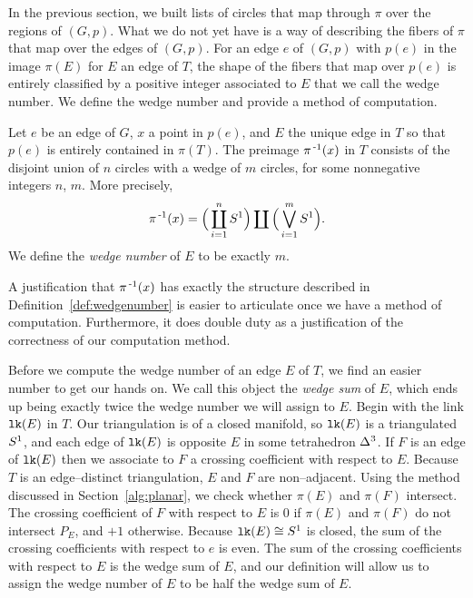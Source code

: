 \label{alg:countwedge}

In the previous section, we built lists of circles that map through $\pi$ over the regions of $(G,p)$.
What we do not yet have is a way of describing the fibers of $\pi$ that map over the edges of $(G,p)$.
For an edge $e$ of $(G,p)$ with $p(e)$ in the image $\pi(E)$ for $E$ an edge of $T$, the shape of the fibers that map over $p(e)$ is entirely classified by a positive integer associated to $E$ that we call the wedge number.
We define the wedge number and provide a method of computation.

\begin{defn}
  \label{def:wedgenumber}
  Let $e$ be an edge of $G$, $x$ a point in $p(e)$, and $E$ the unique edge in $T$ so that $p(e)$ is entirely contained in $\pi(T)$.
  The preimage $\pi^{\,\text{-}1}(x)$ in $T$ consists of the disjoint union of $n$ circles with a wedge of $m$ circles, for some nonnegative integers $n$, $m$.
  More precisely,
  \[
    \pi^{\,\text{-}1}(x) = \Big(\coprod_{i=1}^n S^1\Big)\coprod\Big(\bigvee_{i=1}^m S^1\Big).
  \]
  We define the \emph{wedge number} of $E$ to be exactly $m$.
\end{defn}

\begin{rmk}
  A justification that $\pi^{\,\text{-}1}(x)$ has exactly the structure described in Definition~\ref{def:wedgenumber} is easier to articulate once we have a method of computation.
  Furthermore, it does double duty as a justification of the correctness of our computation method.  
\end{rmk}

Before we compute the wedge number of an edge $E$ of $T$, we find an easier number to get our hands on.
We call this object the \emph{wedge sum} of $E$, which ends up being exactly twice the wedge number we will assign to $E$.
Begin with the link $\texttt{lk}(E)$ in $T$.
Our triangulation is of a closed manifold, so $\texttt{lk}(E)$ is a triangulated $S^1$, and each edge of $\texttt{lk}(E)$ is opposite $E$ in some tetrahedron $\Delta^3$.
If $F$ is an edge of $\texttt{lk}(E)$ then we associate to $F$ a crossing coefficient with respect to $E$.
Because $T$ is an edge--distinct triangulation, $E$ and $F$ are non--adjacent.
Using the method discussed in Section~\ref{alg:planar}, we check whether $\pi(E)$ and $\pi(F)$ intersect.
The crossing coefficient of $F$ with respect to $E$ is $0$ if $\pi(E)$ and $\pi(F)$ do not intersect $P_E$, and $+1$ otherwise.
Because $\texttt{lk}(E)\cong S^1$ is closed, the sum of the crossing coefficients with respect to $e$ is even.
The sum of the crossing coefficients with respect to $E$ is the wedge sum of $E$, and our definition will allow us to assign the wedge number of $E$ to be half the wedge sum of $E$.

